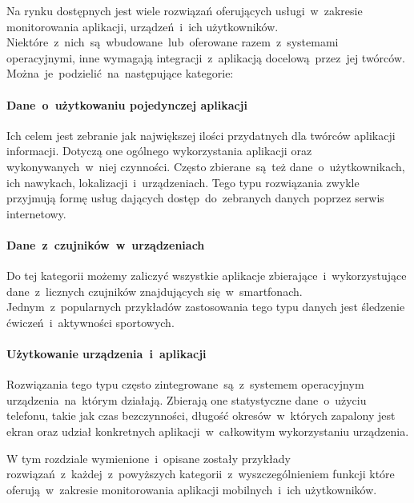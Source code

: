 Na rynku dostępnych jest wiele rozwiązań oferujących usługi~w~zakresie monitorowania aplikacji, urządzeń~i~ich użytkowników. Niektóre~z~nich~są~wbudowane~lub~oferowane razem~z~systemami operacyjnymi, inne wymagają integracji~z~aplikacją docelową~przez~jej twórców. Można~je~podzielić~na~następujące kategorie:

\paragraph{Dane~o~użytkowaniu pojedynczej aplikacji} 
Ich celem jest zebranie jak największej ilości przydatnych dla twórców aplikacji informacji. Dotyczą one ogólnego wykorzystania aplikacji oraz wykonywanych~w~niej czynności. Często zbierane~są~też dane~o~użytkownikach, ich nawykach, lokalizacji~i~urządzeniach. Tego typu rozwiązania zwykle przyjmują formę usług dających dostęp~do~zebranych danych poprzez serwis internetowy. 

\paragraph{Dane~z~czujników~w~urządzeniach} 
Do tej kategorii możemy zaliczyć wszystkie aplikacje zbierające~i~wykorzystujące dane~z~licznych czujników znajdujących się~w~smartfonach. Jednym~z~popularnych przykładów zastosowania tego typu danych jest śledzenie ćwiczeń~i~aktywności sportowych.

\paragraph{Użytkowanie urządzenia~i~aplikacji} 
Rozwiązania tego typu często zintegrowane~są~z~systemem operacyjnym urządzenia~na~którym działają. Zbierają one statystyczne dane~o~użyciu telefonu, takie jak czas bezczynności, długość okresów~w~których zapalony jest ekran oraz udział konkretnych aplikacji~w~całkowitym wykorzystaniu urządzenia.
\bigskip

W tym rozdziale wymienione~i~opisane zostały przykłady rozwiązań~z~każdej~z~powyższych kategorii~z~wyszczególnieniem funkcji które oferują~w~zakresie monitorowania aplikacji mobilnych~i~ich użytkowników.
